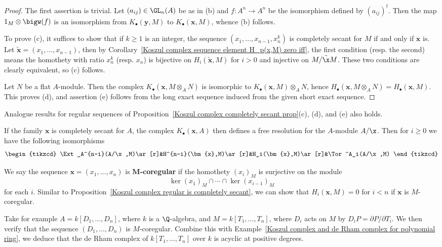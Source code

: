 \begin{proof}
The first assertion is trivial. Let $(a_{ij})\in\GL_n(A)$ be as in (b) and $f:A^n\to A^n$ be the isomorphism defined by $(a_{ij})^t$. Then the map $1_M\otimes\bigw(f)$ is an isomorphism from $K_\bullet(\bm{y},M)$ to $K_\bullet(\bm{x},M)$, whence (b) follows.\par
To prove (c), it suffices to show that if $k\geq 1$ is an integer, the sequence $(x_1,\dots,x_{n-1},x_n^k)$ is completely secant for $M$ if and only if $\bm{x}$ is. Let $\tilde{\bm{x}}=(x_1,\dots,x_{n-1})$, then by Corollary~\ref{Koszul complex sequence element H_p(x,M) zero iff}, the first condition (resp. the second) means the homothety with ratio $x_n^k$ (resp. $x_n$) is bijective on $H_i(\tilde{\bm{x}},M)$ for $i>0$ and injective on $M/\tilde{\x}M$. These two conditions are clearly equivalent, so (c) follows.\par
Let $N$ be a flat $A$-module. Then the complex $K_\bullet(\bm{x},M\otimes_AN)$ is isomorphic to $K_\bullet(\bm{x},M)\otimes_AN$, hence $H_\bullet(\bm{x},M\otimes_AN)=H_\bullet(\bm{x},M)$. This proves (d), and assertion (e) follows from the long exact sequence induced from the given short exact sequence.
\end{proof}
\begin{remark}
Analogue results for regular sequences of Proposition~\ref{Koszul complex completely secant prop}(c), (d), and (e) also holds.
\end{remark}
\begin{remark}
If the family $\bm{x}$ is completely secant for $A$, the complex $K_\bullet(\bm{x},A)$ then defines a free resolution for the $A$-module $A/\x$. Then for $i\geq 0$ we have the following isomorphisms 
\begin{equation}\label{Koszul sequence completely secant for A EXt and Tor iso}
\begin{tikzcd}
\Ext_A^{n-i}(A/\x,M)\ar[r]&H^{n-i}(\bm{x},M)\ar[r]&H_i(\bm{x},M)\ar[r]&\Tor^A_i(A/\x,M)
\end{tikzcd}
\end{equation}
\end{remark}
\begin{example}
We say the sequence $\bm{x}=(x_1,\dots,x_n)$ is \textbf{$\bm{M}$-coregular} if the homothety $(x_i)_M$ is surjective on the module
\[\ker(x_1)_M\cap\cdots\cap\ker(x_{i-1})_M\]
for each $i$. Similar to Proposition~\ref{Koszul complex regular is completely secant}, we can show that $H_i(\bm{x},M)=0$ for $i<n$ if $\bm{x}$ is $M$-coregular.\par
Take for example $A=k[D_1,\dots,D_n]$, where $k$ is a $\Q$-algebra, and $M=k[T_1,\dots,T_n]$, where $D_i$ acts on $M$ by $D_iP=\partial P/\partial T_i$. We then verify that the sequence $(D_1,\dots,D_n)$ is $M$-coregular. Combine this with Example~\ref{Koszul complex and de Rham complex for polynomial ring}, we deduce that the de Rham complex of $k[T_1,\dots,T_n]$ over $k$ is acyclic at positive degrees.
\end{example}
